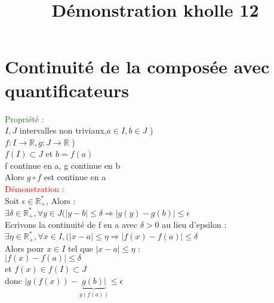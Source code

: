 \documentclass{article}
\begin{document}
\title{Démonstration kholle 12}
\date{}
\maketitle
	\renewcommand{\thesection}{\Roman{section}}
	\setlength{\parindent}{1.5cm}
\section{Continuité de la composée avec quantificateurs}
\textcolor{green}{Propriété :} \\
$I,J$ intervalles non triviaux,$a \in I, b \in J$ )\\
$f : I \rightarrow \mathbb{R}, g: J \rightarrow \mathbb{R}$ )\\ 
$f(I) \subset J$ et $b=f(a)$ \\ 
f continue en a, g continue en b \\ 
Alors $g \circ f$ est continue en a \\  
\textcolor{red}{Démonstration :} \\
Soit $\epsilon \in \mathbb{R}^*_+$, Alors : \\
$\exists \delta \in \mathbb{R}^*_+, \forall y \in J (|y-b| \leq \delta \Rightarrow |g(y)-g(b)| \leq \epsilon $ \\ 
Ecrivons la continuité de f en a avec $\delta >0$ au lieu d'epsilon : \\ 
$\exists \eta \in \mathbb{R}^*_+, \forall x \in I, (|x-a| \leq \eta \Rightarrow |f(x)-f(a)| \leq \delta$ \\ 
Alors pour $x \in I$ tel que $|x-a| \leq \eta$ : \\ 
$|f(x)-f(a)| \leq \delta$ \\
et $f(x) \in f(I) \subset J$ \\ 
donc $|g(f(x))-\underbrace{g(b)|}_{g(f(a))} \leq \epsilon$
\end{document}
